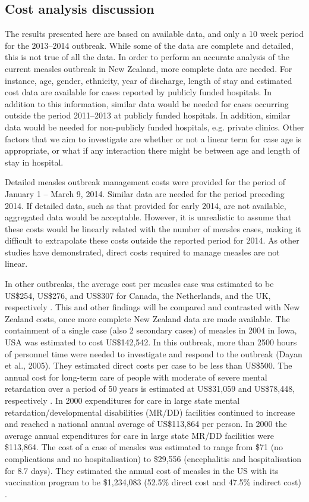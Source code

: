 \documentclass{article}
\begin{document}
\subsection{Cost analysis discussion}
The results presented here are based on available data, and only a 10 week period for the 2013--2014 outbreak. While some of the data are complete and detailed, this is not true of all the data. In order to perform an accurate analysis of the current measles outbreak in New Zealand, more complete data are needed. For instance, age, gender, ethnicity, year of discharge, length of stay and estimated cost data are available for cases reported by publicly funded hospitals. In addition to this information, similar data would be needed for cases occurring outside the period 2011--2013 at publicly funded hospitals. In addition, similar data would be needed for non-publicly funded hospitals, e.g. private clinics. Other factors that we aim to investigate are whether or not a linear term for case age is appropriate, or what if any interaction there might be between age and length of stay in hospital.

Detailed measles outbreak management costs were provided for the period of January 1 -- March 9, 2014. Similar data are needed for the period preceding 2014. If detailed data, such as that provided for early 2014, are not available, aggregated data would be acceptable. However, it is unrealistic to assume that these costs would be linearly related with the number of measles cases, making it difficult to extrapolate these costs outside the reported period for 2014. As other studies have demonstrated, direct costs required to manage measles are not linear.

In other outbreaks, the average cost per measles case was estimated to be US\$254, US\$276, and US\$307 for Canada, the Netherlands, and the UK, respectively \citep{carabin02}. This and other findings will be compared and contrasted with New Zealand costs, once more complete New Zealand data are made available.
The containment of a single case (also 2 secondary cases) of measles in 2004 in Iowa, USA was estimated to cost US\$142,542. In this outbreak, more than 2500 hours of personnel time were needed to investigate and respond to the outbreak (Dayan et al., 2005). They estimated direct costs per case to be less than US\$500. 
The annual cost for long-term care of people with moderate of severe mental retardation over a period of 50 years is estimated at US\$31,059 and US\$78,448, respectively \citep{prouty1}. In 2000 expenditures for care in large state mental retardation/developmental disabilities (MR/DD) facilities continued to increase and reached a national annual average of US\$113,864 per person. In 2000 the average annual expenditures for care in large state MR/DD facilities were \$113,864. The cost of a case of measles was estimated to range from \$71 (no complications and no hospitalisation) to \$29,556 (encephalitis and hospitalisation for 8.7 days). They estimated the annual cost of measles in the US with its vaccination program to be \$1,234,083 (52.5\% direct cost and 47.5\% indirect cost) \citep{zhou4}.
\end{document}
